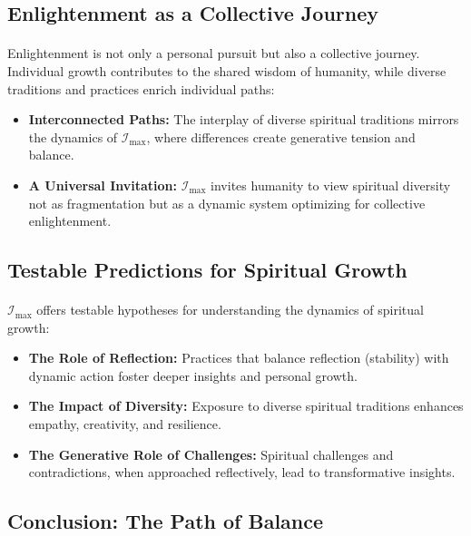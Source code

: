 \documentclass[12pt]{article}
\begin{document}
\subsection{Enlightenment as a Collective Journey}
\paragraph{}
Enlightenment is not only a personal pursuit but also a collective journey. Individual growth contributes to the shared wisdom of humanity, while diverse traditions and practices enrich individual paths:
\begin{itemize}
    \item \textbf{Interconnected Paths:} The interplay of diverse spiritual traditions mirrors the dynamics of \(\mathcal{I}_{\text{max}}\), where differences create generative tension and balance.
    \item \textbf{A Universal Invitation:} \(\mathcal{I}_{\text{max}}\) invites humanity to view spiritual diversity not as fragmentation but as a dynamic system optimizing for collective enlightenment.
\end{itemize}

\subsection{Testable Predictions for Spiritual Growth}
\paragraph{}
\(\mathcal{I}_{\text{max}}\) offers testable hypotheses for understanding the dynamics of spiritual growth:
\begin{itemize}
    \item \textbf{The Role of Reflection:} Practices that balance reflection (stability) with dynamic action foster deeper insights and personal growth.
    \item \textbf{The Impact of Diversity:} Exposure to diverse spiritual traditions enhances empathy, creativity, and resilience.
    \item \textbf{The Generative Role of Challenges:} Spiritual challenges and contradictions, when approached reflectively, lead to transformative insights.
\end{itemize}

\subsection{Conclusion: The Path of Balance}
\end{document}
